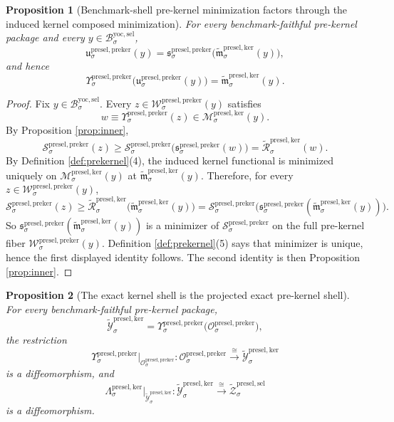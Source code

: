 \documentclass[11pt]{article}
\newcommand{\YoctoSelectorBody}[1]{\mathcal B_{#1}^{\mathrm{yoc,sel}}}
\newcommand{\KernelProj}[1]{\Lambda_{#1}^{\mathrm{presel,ker}}}
\newcommand{\KernelComposedFiber}[2]{\mathcal M_{#1}^{\mathrm{presel,ker}}(#2)}
\newcommand{\PreKernelProj}[1]{\Upsilon_{#1}^{\mathrm{presel,preker}}}
\newcommand{\PreKernelFunctional}[1]{\mathscr S_{#1}^{\mathrm{presel,preker}}}
\newcommand{\PreKernelMinLift}[1]{\mathfrak s_{#1}^{\mathrm{presel,preker}}}
\newcommand{\PreKernelFullFiber}[2]{\mathcal W_{#1}^{\mathrm{presel,preker}}(#2)}
\newcommand{\PreKernelFullMin}[1]{\mathfrak u_{#1}^{\mathrm{presel,preker}}}
\newcommand{\PreKernelShell}[1]{\mathcal O_{#1}^{\mathrm{presel,preker}}}
\newcommand{\InducedSelectorShell}[1]{\widetilde{\mathcal Z}_{#1}^{\mathrm{presel,sel}}}
\newcommand{\InducedKernelFunctional}[1]{\widetilde{\mathscr R}_{#1}^{\mathrm{presel,ker}}}
\newcommand{\InducedKernelComposedMin}[1]{\widetilde{\mathfrak m}_{#1}^{\mathrm{presel,ker}}}
\newcommand{\InducedKernelShell}[1]{\widetilde{\mathcal Y}_{#1}^{\mathrm{presel,ker}}}
\newtheorem{proposition}{Proposition}
\begin{document}
\begin{proposition}[Benchmark-shell pre-kernel minimization factors through the induced kernel composed minimization]
\label{prop:fullfactor}
For every benchmark-faithful pre-kernel package and every \(y\in\YoctoSelectorBody{\sigma}\),
\[
\PreKernelFullMin{\sigma}(y)
=
\PreKernelMinLift{\sigma}\bigl(\InducedKernelComposedMin{\sigma}(y)\bigr),
\]
and hence
\[
\PreKernelProj{\sigma}\bigl(\PreKernelFullMin{\sigma}(y)\bigr)
=
\InducedKernelComposedMin{\sigma}(y).
\]
\end{proposition}

\begin{proof}
Fix \(y\in\YoctoSelectorBody{\sigma}\). Every \(z\in\PreKernelFullFiber{\sigma}{y}\) satisfies
\[
w\equiv\PreKernelProj{\sigma}(z)\in\KernelComposedFiber{\sigma}{y}.
\]
By Proposition \ref{prop:inner},
\[
\PreKernelFunctional{\sigma}(z)
\geq
\PreKernelFunctional{\sigma}\bigl(\PreKernelMinLift{\sigma}(w)\bigr)
=
\InducedKernelFunctional{\sigma}(w).
\]
By Definition \ref{def:prekernel}(4), the induced kernel functional is minimized uniquely on \(\KernelComposedFiber{\sigma}{y}\) at \(\InducedKernelComposedMin{\sigma}(y)\). Therefore, for every \(z\in\PreKernelFullFiber{\sigma}{y}\),
\[
\PreKernelFunctional{\sigma}(z)
\geq
\InducedKernelFunctional{\sigma}\bigl(\InducedKernelComposedMin{\sigma}(y)\bigr)
=
\PreKernelFunctional{\sigma}\bigl(\PreKernelMinLift{\sigma}(\InducedKernelComposedMin{\sigma}(y))\bigr).
\]
So \(\PreKernelMinLift{\sigma}(\InducedKernelComposedMin{\sigma}(y))\) is a minimizer of \(\PreKernelFunctional{\sigma}\) on the full pre-kernel fiber \(\PreKernelFullFiber{\sigma}{y}\). Definition \ref{def:prekernel}(5) says that minimizer is unique, hence the first displayed identity follows. The second identity is then Proposition \ref{prop:inner}.
\end{proof}

\begin{proposition}[The exact kernel shell is the projected exact pre-kernel shell]
\label{prop:shell}
For every benchmark-faithful pre-kernel package,
\[
\InducedKernelShell{\sigma}
=
\PreKernelProj{\sigma}\bigl(\PreKernelShell{\sigma}\bigr),
\]
the restriction
\[
\PreKernelProj{\sigma}\big|_{\PreKernelShell{\sigma}}
:
\PreKernelShell{\sigma}\xrightarrow{\cong}\InducedKernelShell{\sigma}
\]
is a diffeomorphism, and
\[
\KernelProj{\sigma}\big|_{\InducedKernelShell{\sigma}}
:
\InducedKernelShell{\sigma}\xrightarrow{\cong}\InducedSelectorShell{\sigma}
\]
is a diffeomorphism.
\end{proposition}
\end{document}
